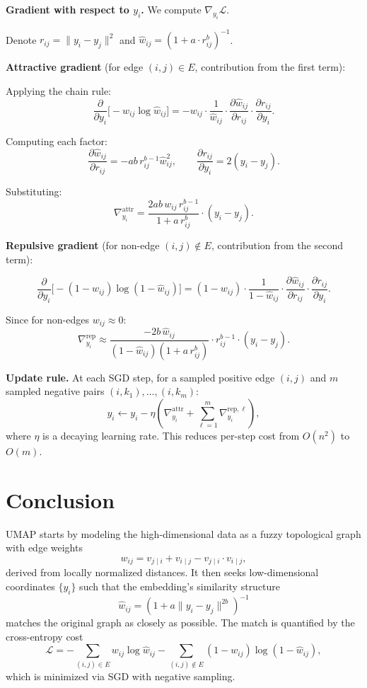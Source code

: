 \documentclass[11pt]{article}
\begin{document}
\textbf{Gradient with respect to $y_i$.} We compute $\nabla_{y_i} \mathcal{L}$.

Denote $r_{ij} = \|y_i - y_j\|^2$ and $\hat{w}_{ij} = (1 + a \cdot r_{ij}^b)^{-1}$.

\textbf{Attractive gradient} (for edge $(i, j) \in E$, contribution from the first term):

Applying the chain rule:
\[
  \frac{\partial}{\partial y_i}\bigl[-w_{ij} \log \hat{w}_{ij}\bigr]
  = -w_{ij} \cdot \frac{1}{\hat{w}_{ij}} \cdot \frac{\partial \hat{w}_{ij}}{\partial r_{ij}} \cdot \frac{\partial r_{ij}}{\partial y_i}.
\]

Computing each factor:
\[
  \frac{\partial \hat{w}_{ij}}{\partial r_{ij}} = -a b \, r_{ij}^{b-1} \hat{w}_{ij}^2,
  \qquad
  \frac{\partial r_{ij}}{\partial y_i} = 2(y_i - y_j).
\]

Substituting:
\[
  \nabla_{y_i}^{\mathrm{attr}} = \frac{2 a b \, w_{ij} \, r_{ij}^{b-1}}{1 + a \, r_{ij}^b} \cdot (y_i - y_j).
\]

\textbf{Repulsive gradient} (for non-edge $(i, j) \notin E$, contribution from the second term):

\[
  \frac{\partial}{\partial y_i}\bigl[-(1-w_{ij})\log(1-\hat{w}_{ij})\bigr]
  = (1-w_{ij}) \cdot \frac{1}{1-\hat{w}_{ij}} \cdot \frac{\partial \hat{w}_{ij}}{\partial r_{ij}} \cdot \frac{\partial r_{ij}}{\partial y_i}.
\]

Since for non-edges $w_{ij} \approx 0$:
\[
  \nabla_{y_i}^{\mathrm{rep}} \approx \frac{-2 b \, \hat{w}_{ij}}{(1-\hat{w}_{ij})(1 + a\,r_{ij}^b)} \cdot r_{ij}^{b-1} \cdot (y_i - y_j).
\]

\textbf{Update rule.} At each SGD step, for a sampled positive edge $(i,j)$ and $m$ sampled negative pairs $(i, k_1), \ldots, (i, k_m)$:
\[
  y_i \leftarrow y_i - \eta \left(\nabla_{y_i}^{\mathrm{attr}} + \sum_{\ell=1}^{m} \nabla_{y_i}^{\mathrm{rep},\ell}\right),
\]
where $\eta$ is a decaying learning rate. This reduces per-step cost from $O(n^2)$ to $O(m)$.

\section*{Conclusion}

UMAP starts by modeling the high-dimensional data as a fuzzy topological graph with edge weights
\[
  w_{ij} = v_{j \mid i} + v_{i \mid j} - v_{j \mid i} \cdot v_{i \mid j},
\]
derived from locally normalized distances. It then seeks low-dimensional coordinates $\{y_i\}$ such that the embedding's similarity structure
\[
  \hat{w}_{ij} = \left(1 + a\|y_i - y_j\|^{2b}\right)^{-1}
\]
matches the original graph as closely as possible. The match is quantified by the cross-entropy cost
\[
  \mathcal{L} = -\sum_{(i,j)\in E} w_{ij} \log \hat{w}_{ij}
  - \sum_{(i,j)\notin E} (1-w_{ij})\log(1-\hat{w}_{ij}),
\]
which is minimized via SGD with negative sampling.
\end{document}
